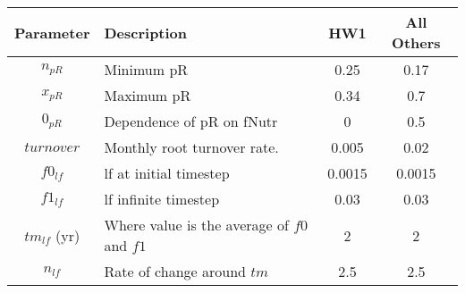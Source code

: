 \begin{tabularx}{\linewidth}{|c|X|c|c|}
\hline
Parameter & Description & HW1 & All Others\\
\hline
 $n_{pR}$ & Minimum \acf{pR} & 0.25 & 0.17\\
 $x_{pR}$ & Maximum \ac{pR} & 0.34 & 0.7\\
 $0_{pR}$ & Dependence of \ac{pR} on \ac{fNutr}  & 0 &  0.5\\
 $turnover$ & Monthly root turnover rate. & 0.005 & 0.02\\
 \hline
  $f0_{lf}$ & \acf{lf} at initial timestep & 0.0015 & 0.0015\\
  $f1_{lf}$ & \ac{lf} infinite timestep & 0.03 & 0.03\\
  $tm_{lf}$ (yr) & Where value is the average of $f0$ and $f1$ & 2 &2 \\
  $n_{lf}$  & Rate of change around $tm$ & 2.5 & 2.5\\
 \hline
\end{tabularx}
